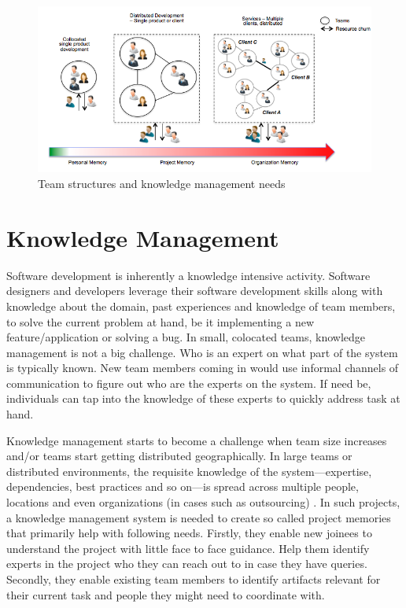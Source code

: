 
\begin{figure}
	\center
	\includegraphics[scale=0.7]{figs/km-types.png}
	\caption{Team structures and knowledge management needs}
	\label{fig-km}
\end{figure}

\section{Knowledge Management}
\label{sec:km}

Software development is inherently a knowledge intensive activity. Software designers and developers leverage their software development skills along with knowledge about the domain, past experiences and knowledge of team members, to solve the current problem at hand, be it implementing a new feature/application or solving a bug. 
In small, colocated teams, knowledge management is not a big challenge. Who is an expert on what part of the system is typically known. New team members coming in would use informal channels of communication to figure out who are the experts on the system. If need be, individuals can tap into the knowledge of these experts to quickly address task at hand. 

Knowledge management starts to become a challenge when team size increases and/or teams start getting distributed geographically. In large teams or distributed environments, the requisite knowledge of the system---expertise, dependencies, best practices and so on---is spread across multiple people, locations and even organizations (in cases such as outsourcing) \cite{Desouza:2006}. In such projects, a knowledge management system is needed to create so called project memories that primarily help with following needs. Firstly, they enable new joinees to understand the project with little face to face guidance. Help them identify experts in the project who they can reach out to in case they have queries. Secondly, they enable existing team members to identify artifacts relevant for their current task and people they might need to coordinate with. 

